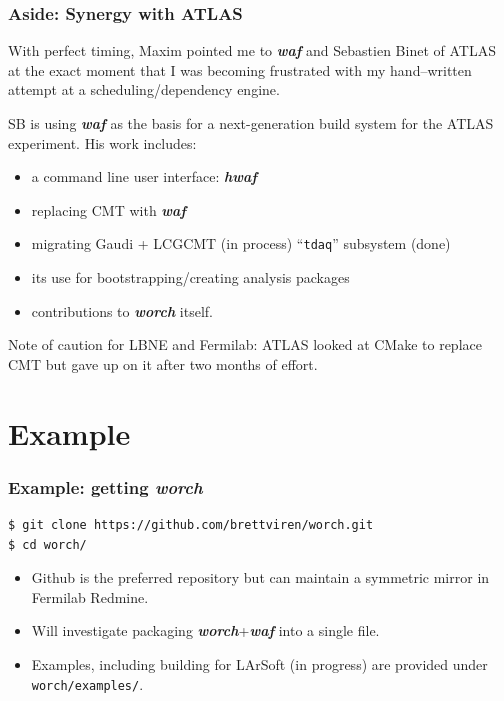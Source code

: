 \documentclass[xcolor=dvipsnames]{beamer}
\newcommand{\app}[1]{\textbf{\textit{#1}}\xspace}
\def\waf{\app{waf}}
\def\hwaf{\app{hwaf}}
\def\worch{\app{worch}}
\begin{document}
\begin{frame}
  \frametitle{Aside: Synergy with ATLAS}
  
  With perfect timing, Maxim pointed me to \waf and Sebastien Binet of
  ATLAS at the exact moment that I was becoming frustrated with my
  hand--written attempt at a scheduling/dependency engine.
  
  SB is using \waf as the basis for a next-generation build system for the ATLAS experiment.  His work includes: 
  \begin{itemize}
  \item a command line user interface: \hwaf
  \item replacing CMT with \waf
  \item migrating Gaudi + LCGCMT (in process) ``\texttt{tdaq}'' subsystem (done)
  \item its use for bootstrapping/creating analysis packages
  \item contributions to \worch itself.
  \end{itemize}

  \vspace{5mm}
  Note of caution for LBNE and Fermilab: ATLAS looked at CMake to
  replace CMT but gave up on it after two months of effort.

\end{frame}

\section{Example}

\begin{frame}[fragile]
  \frametitle{Example: getting \worch}

\begin{verbatim}
$ git clone https://github.com/brettviren/worch.git
$ cd worch/
\end{verbatim}

  \begin{itemize}
  \item   Github is the preferred repository but can maintain a symmetric
    mirror in Fermilab Redmine.

  \item   Will investigate packaging \worch+\waf into a single file.

  \item   Examples, including building for LArSoft (in progress) are provided
    under \texttt{worch/examples/}.  

  \end{itemize}


\end{frame}
\end{document}
